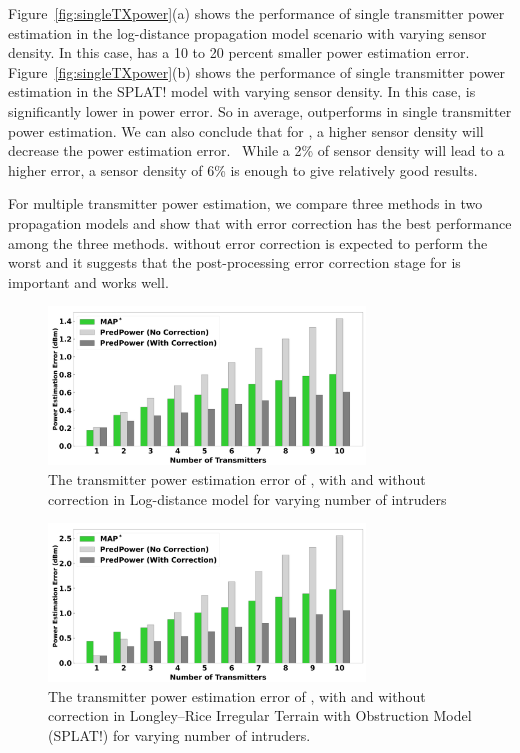 Figure~\ref{fig:singleTXpower}(a) shows the performance of single transmitter power estimation in the log-distance propagation model scenario with varying sensor density.
In this case, \map has a 10 to 20 percent smaller power estimation error.
Figure~\ref{fig:singleTXpower}(b) shows the performance of single transmitter power estimation in the SPLAT! model with varying sensor density.
In this case, \power is significantly lower in power error.
So in average, \power outperforms \map in single transmitter power estimation.
We can also conclude that for \power, a higher sensor density will decrease the power estimation error. \
While a 2\% of sensor density will lead to a higher error, a sensor density of 6\% is enough to give relatively good results.

For multiple transmitter power estimation, we compare three methods in two propagation models and show that \power with error correction has the best performance among the three methods.
\power without error correction is expected to perform the worst and it suggests that the post-processing error correction stage for \power is important and works well.
\begin{figure}[t]
    \centering
    \includegraphics[width=0.75\textwidth]{chapters/wowmom-pmc/figures/logdist-powererror_varyintru.png}
    \caption{The transmitter power estimation error of \map, \power with and without correction in Log-distance model for varying number of intruders}
    \label{fig:logdistance-multiTXpower}
\end{figure}
\begin{figure}[t]
    \centering
    \includegraphics[width=0.75\textwidth]{chapters/wowmom-pmc/figures/splat-powererror_varyintru.png}
    \vspace{-0.1in}
    \caption{The transmitter power estimation error of \map,  \power with and without correction in Longley--Rice Irregular Terrain with Obstruction Model (SPLAT!) for varying number of intruders.}
    \label{fig:splat-multiTXpower}
\end{figure}
